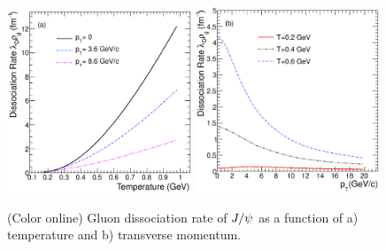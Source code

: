 \documentclass[aps,prc,preprint,superscriptaddress,showpacs,showkeys]{revtex4-1}
\begin{document}
\begin{figure}
\includegraphics[width=0.49\textwidth]{Figures/Fig3a_DRateVsT.eps}
\includegraphics[width=0.49\textwidth]{Figures/Fig3b_DRateVsPt.eps}
\caption{(Color online) Gluon dissociation rate of $J/\psi$ as a function of a) temperature and  b) transverse momentum.}
\label{fig:DRateVsTempAndPt}
\end{figure}


%
\end{document}
